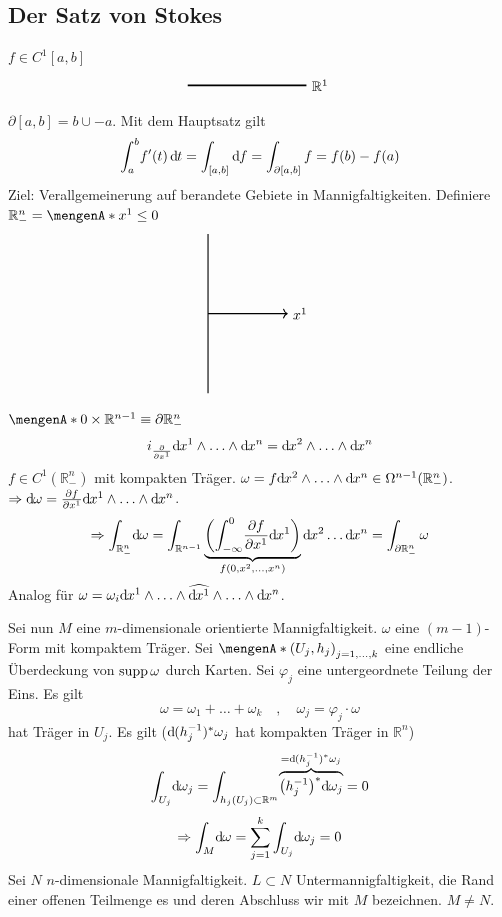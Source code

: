 \subsection{Der Satz von Stokes} %
\label{sub:61}
$f \in C^1[a,b]$
\[
	\begin{tikzpicture}
		\draw[very thick] (0,0) -- (3,0) node[right]{$\mathds{R}^1$};
	\end{tikzpicture}
\]
$\partial [a,b] = b \cup -a$. Mit dem Hauptsatz gilt
\[
	\int_{a} ^{b} \! f'(t)  \, \mathd t =\int_{[a,b]}\mathd f = \int_{\partial[a,b]} f = f(b)- f(a)
\]
Ziel: Verallgemeinerung auf berandete Gebiete in Mannigfaltigkeiten. Definiere $\mathds{R}^n_- = \set{x^1 \le 0}$
\[
	\begin{tikzpicture}
		\draw[thick] (0,-2) -- (0,2);
		\draw[thick, ->] (0,0) -- (2,0) node[right]{$x^1$} ;
	\end{tikzpicture}
\]
$\set{0} \times \mathds{R}^{n-1}  \equiv \partial \mathds{R}^n_-$
\[
	i_{\diff{}{x^1} }\mathd x^1 \wedge \ldots \wedge \mathd x^n = \mathd x^2 \wedge \ldots \wedge \mathd x^n
\]
$f \in C^1(\mathds{R}^n_-)$ mit kompakten Träger. 
$\omega = f \mathd x^2 \wedge \ldots \wedge \mathd x^n \in \Omega^{n-1} (\mathds{R}^n_-)$.
$\Rightarrow \mathd \omega = \diff{f}{x^1} \mathd x^1 \wedge \ldots \wedge \mathd x^n $. 
\[
	\Rightarrow \int_{\mathds{R}^n_-} \!  \mathd \omega = \int_{\mathds{R}^{n-1}} 
	\underbrace{\enbrace*{ \int_{-\infty} ^{0} \! \diff{f}{x^1} \mathd x^1 }}_{f(0, x^2, \ldots , x^n)} \mathd x^2 \ldots \mathd x^n = \int_{\partial \mathds{R}^n_-} \omega 
\] 
Analog für $\omega=\omega_i \mathd x^1 \wedge \ldots \wedge \widehat{\mathd x^1} \wedge \ldots  \wedge \mathd x^n$.

Sei nun $M$ eine $m$-dimensionale orientierte Mannigfaltigkeit. $\omega$ eine $(m-1)$-Form mit kompaktem Träger. Sei $\set{(U_j, h_j)}_{j=1, \ldots ,k}$ eine endliche 
Überdeckung von $\supp \omega$ durch Karten.  Sei $\varphi_j$ eine untergeordnete Teilung der Eins. Es gilt
\[
	\omega = \omega_1 + \ldots + \omega_k \quad ,\quad \omega_j = \varphi_j \cdot \omega
\]
hat Träger in $U_j$. Es gilt ($\mathd (h_j ^{-1})^* \omega_j$ hat kompakten Träger in $\mathds{R}^n$)
\[
	\int_{U_j} \!  \mathd \omega_j = \int_{h_j(U_j) \subset \mathds{R}^m}  \!  \overbrace{ \enbrace*{h_j ^{-1}}^* \mathd \omega_j }^{=\mathd (h_j ^{-1})^* \omega_j} = 0
\]
\[
	\Rightarrow \int_{M} \! \mathd \omega = \sum_{j=1}^{k} \int_{U_j} \! \mathd \omega_j = 0
\]
Sei $N$ $n$-dimensionale Mannigfaltigkeit. $L \subset N$ Untermannigfaltigkeit, die Rand einer offenen Teilmenge es und deren Abschluss wir mit $M$ bezeichnen. $M \not= N$.

